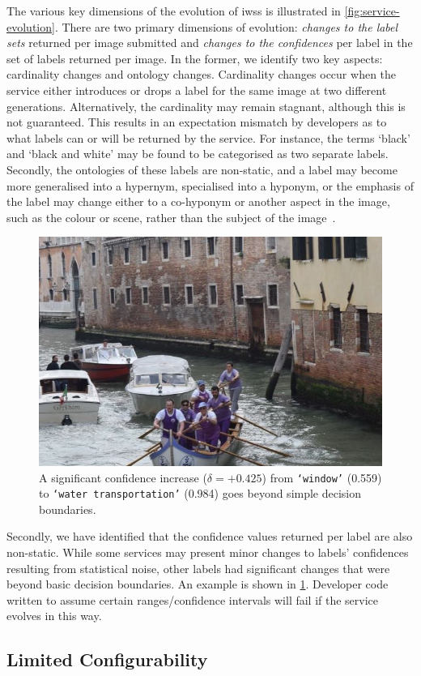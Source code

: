 The various key dimensions of the evolution of \glspl{iws} is illustrated in \cref{fig:service-evolution}. There are two primary dimensions of evolution: \textit{changes to the label sets} returned per image submitted and \textit{changes to the confidences} per label in the set of labels returned per image. In the former, we identify two key aspects: cardinality changes and ontology changes. Cardinality changes occur when the service either introduces or drops a label for the same image at two different generations. Alternatively, the cardinality may remain stagnant, although this is not guaranteed. This results in an expectation mismatch by developers as to what labels can or will be returned by the service. For instance, the terms `black' and `black and white' may be found to be categorised as two separate labels. Secondly, the ontologies of these labels are non-static, and a label may become more generalised into a hypernym, specialised into a hyponym, or the emphasis of the label may change either to a co-hyponym or another aspect in the image, such as the colour or scene, rather than the subject of the image~\citep{Cummaudo:2019icsme}.

\begin{figure}
    \centering
    \includegraphics[width=0.4\linewidth]{large-delta}
    \caption[Example of substantial confidence change]{A significant confidence increase ($\delta = +0.425$) from \texttt{`window'} (0.559) to \texttt{`water transportation'} (0.984) goes beyond simple decision boundaries.}
    \label{fig:large-delta}
\end{figure}

Secondly, we have identified that the confidence values returned per label are also non-static. While some services may present minor changes to labels' confidences resulting from statistical noise, other labels had significant changes that were beyond basic decision boundaries. An example is shown in \cref{fig:large-delta}. Developer code written to assume certain ranges/confidence intervals will fail if the service evolves in this way.

\subsection{Limited Configurability}


